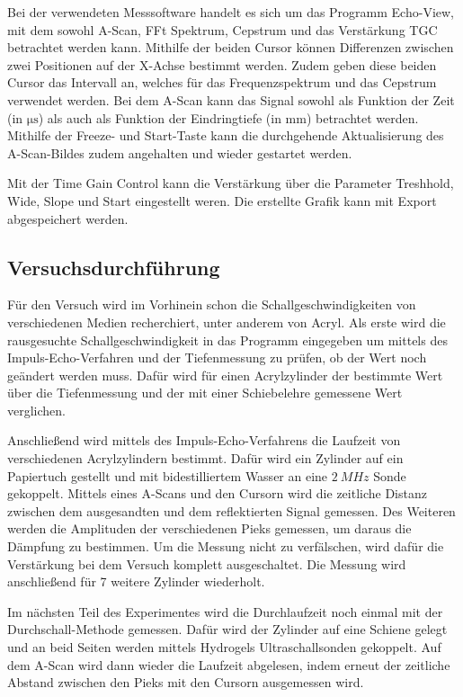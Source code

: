 Bei der verwendeten Messsoftware handelt es sich um das Programm Echo-View, mit
dem sowohl A-Scan, FFt Spektrum, Cepstrum und das Verstärkung TGC betrachtet
werden kann. Mithilfe der beiden Cursor können Differenzen zwischen zwei Positionen
auf der X-Achse bestimmt werden. Zudem geben diese beiden Cursor das Intervall
an, welches für das Frequenzspektrum und das Cepstrum verwendet werden.
Bei dem A-Scan kann das Signal sowohl als Funktion der Zeit (in $\si{\micro\second}$)
als auch als Funktion der Eindringtiefe (in mm) betrachtet werden. Mithilfe der
Freeze- und Start-Taste kann die durchgehende Aktualisierung des A-Scan-Bildes
zudem angehalten und wieder gestartet werden.

Mit der Time Gain Control kann die Verstärkung über die Parameter Treshhold, Wide,
Slope und Start eingestellt weren. Die erstellte Grafik kann mit Export abgespeichert
werden.


\subsection{Versuchsdurchführung}

Für den Versuch wird im Vorhinein schon die Schallgeschwindigkeiten von verschiedenen
Medien recherchiert, unter anderem von Acryl. Als erste wird die rausgesuchte
Schallgeschwindigkeit in das Programm eingegeben um mittels des
Impuls-Echo-Verfahren und der Tiefenmessung zu prüfen, ob der Wert noch geändert
werden muss. Dafür wird für einen Acrylzylinder der bestimmte Wert über die
Tiefenmessung und der mit einer Schiebelehre gemessene Wert verglichen.

Anschließend wird mittels des Impuls-Echo-Verfahrens die Laufzeit von verschiedenen
Acrylzylindern bestimmt. Dafür wird ein Zylinder auf ein Papiertuch gestellt und
mit bidestilliertem Wasser an eine $\SI{2}{MHz}$ Sonde gekoppelt. Mittels eines
A-Scans und den Cursorn wird die zeitliche Distanz zwischen dem ausgesandten und
dem reflektierten Signal gemessen.
Des Weiteren werden die Amplituden der verschiedenen Pieks gemessen, um
daraus die Dämpfung zu bestimmen. Um die Messung nicht zu verfälschen, wird dafür
die Verstärkung bei dem Versuch komplett ausgeschaltet. Die Messung wird anschließend
für 7 weitere Zylinder wiederholt.

Im nächsten Teil des Experimentes wird die Durchlaufzeit noch einmal mit der
Durchschall-Methode gemessen. Dafür wird der Zylinder auf eine Schiene gelegt und
an beid Seiten werden mittels Hydrogels Ultraschallsonden gekoppelt. Auf dem
A-Scan wird dann wieder die Laufzeit abgelesen, indem erneut der zeitliche
Abstand zwischen den Pieks mit den Cursorn ausgemessen wird.

